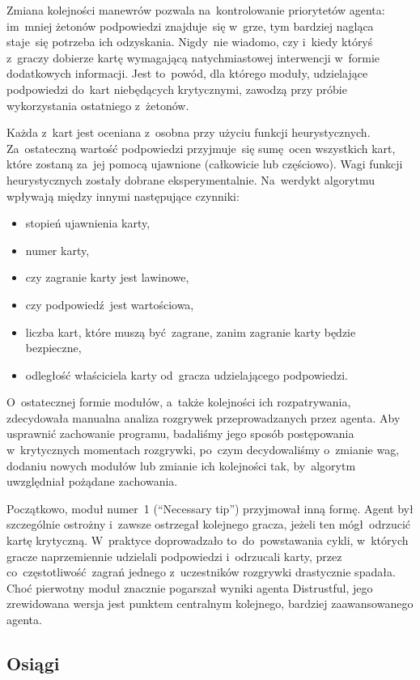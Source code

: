 \documentclass[declaration,shortabstract,inz]{iithesis}
\begin{document}
Zmiana kolejności manewrów pozwala na~kontrolowanie priorytetów agenta: im~mniej żetonów podpowiedzi znajduje~się w~grze, tym bardziej nagląca staje~się potrzeba ich odzyskania. Nigdy~nie wiadomo, czy i~kiedy któryś z~graczy dobierze kartę wymagającą natychmiastowej interwencji w~formie dodatkowych informacji. Jest to~powód, dla którego moduły, udzielające podpowiedzi do~kart niebędących krytycznymi, zawodzą przy próbie wykorzystania ostatniego z~żetonów.

Każda z~kart jest oceniana z~osobna przy użyciu funkcji heurystycznych. Za~ostateczną wartość podpowiedzi przyjmuje~się sumę ocen wszystkich kart, które zostaną za~jej pomocą ujawnione (całkowicie lub częściowo). Wagi funkcji heurystycznych zostały dobrane eksperymentalnie. Na~werdykt algorytmu wpływają między innymi następujące czynniki:
\begin{itemize}
	\item stopień ujawnienia karty,
	\item numer karty,
	\item czy zagranie karty jest lawinowe,
	\item czy podpowiedź jest wartościowa,
	\item liczba kart, które muszą być zagrane, zanim zagranie karty będzie bezpieczne,
	\item odległość właściciela karty od~gracza udzielającego podpowiedzi.
\end{itemize}

O~ostatecznej formie modułów, a~także kolejności ich rozpatrywania, zdecydowała manualna analiza rozgrywek przeprowadzanych przez agenta. Aby usprawnić zachowanie programu, badaliśmy jego sposób postępowania w~krytycznych momentach rozgrywki, po~czym decydowaliśmy o~zmianie wag, dodaniu nowych modułów lub zmianie ich kolejności tak, by~algorytm uwzględniał pożądane zachowania.

Początkowo, moduł numer~1 (``Necessary tip'') przyjmował inną formę. Agent był szczególnie ostrożny i~zawsze ostrzegał kolejnego gracza, jeżeli ten mógł odrzucić kartę krytyczną. W~praktyce doprowadzało to~do~powstawania cykli, w~których gracze naprzemiennie udzielali podpowiedzi i~odrzucali karty, przez co~częstotliwość zagrań jednego z~uczestników rozgrywki drastycznie spadała. Choć pierwotny moduł znacznie pogarszał wyniki agenta Distrustful, jego zrewidowana wersja jest punktem centralnym kolejnego, bardziej zaawansowanego agenta.

\subsection*{Osiągi}
\end{document}
